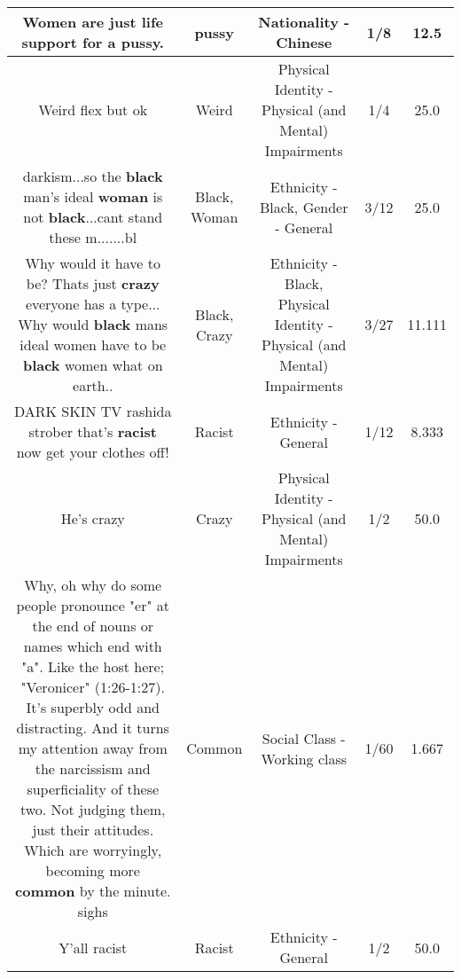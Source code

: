 \documentclass[11pt]{article}
\newlength\mylength
\begin{document}
\begin{center}
\begin{longtable}{|C{.65\mylength}|C{.30\mylength}|C{.12\mylength}|C{.12\mylength}|C{.12\mylength}|}
  \small Women are just life support for a \textbf{pussy}.\normalsize   & pussy & Nationality - Chinese & 1/8 & 12.5 \\  \hline
  \small Weird flex but ok\normalsize   & Weird & Physical Identity - Physical (and Mental) Impairments & 1/4 & 25.0 \\  \hline
  \small darkism...so the \textbf{black} man's ideal \textbf{woman} is not \textbf{black}...cant stand these m.......bl\normalsize   & Black, Woman & Ethnicity - Black, Gender - General & 3/12 & 25.0 \\  \hline
  \small Why would it have to be? Thats just \textbf{crazy} everyone has a type... Why would \textbf{black} mans ideal women have to be \textbf{black} women what on earth..\normalsize   & Black, Crazy & Ethnicity - Black, Physical Identity - Physical (and Mental) Impairments & 3/27 & 11.111 \\  \hline
  \small DARK SKIN TV rashida strober that's \textbf{racist} now get your clothes off!\normalsize   & Racist & Ethnicity - General & 1/12 & 8.333 \\  \hline
  \small He's crazy\normalsize   & Crazy & Physical Identity - Physical (and Mental) Impairments & 1/2 & 50.0 \\  \hline
  \small Why, oh why do some people pronounce "er" at the end of nouns or names which end with "a". Like the host here; "Veronicer" (1:26-1:27). It's superbly odd and distracting. And it turns my attention away from the narcissism and superficiality of these two. Not judging them, just their attitudes. Which are worryingly, becoming more \textbf{common} by the minute. sighs\normalsize   & Common & Social Class - Working class & 1/60 & 1.667 \\  \hline
  \small Y'all racist\normalsize   & Racist & Ethnicity - General & 1/2 & 50.0 \\  \hline

\end{longtable}
\end{center}
\end{document}
